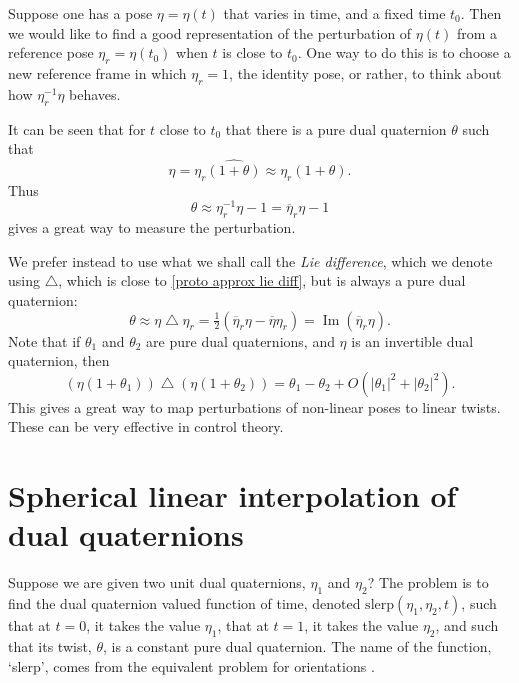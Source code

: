 \documentclass[reqno,12pt]{amsart}
\DeclareMathOperator\imagpart{Im}
\newcommand{\liediff}{\mathbin{\triangle}}
\begin{document}
Suppose one has a pose $\eta = \eta(t)$ that varies in time, and a fixed time $t_0$.  Then we would like to find a good representation of the perturbation of $\eta(t)$ from a reference pose $\eta_r = \eta(t_0)$ when $t$ is close to $t_0$.  One way to do this is to choose a new reference frame in which $\eta_r = 1$, the identity pose, or rather, to think about how $\eta_r ^{-1} \eta$ behaves.

It can be seen that for $t$ close to $t_0$ that there is a pure dual quaternion $\theta$ such that
\begin{equation}
\eta = \eta_r \widehat{(1 + \theta)} \approx \eta_r (1 + \theta) .
\end{equation}
Thus
\begin{equation}
\label{proto approx lie diff}
\theta \approx \eta_r^{-1} \eta - 1 = \overline\eta_r \eta - 1
\end{equation}
gives a great way to measure the perturbation.

We prefer instead to use what we shall call the \emph{Lie difference}, which we denote using $\liediff$, which is close to \eqref{proto approx lie diff}, but is always a pure dual quaternion:
\begin{equation}
\theta \approx \eta\liediff\eta_r = \tfrac12 (\overline\eta_r \eta - \overline\eta \eta_r) = \imagpart(\overline\eta_r \eta).
\end{equation}
Note that if $\theta_1$ and $\theta_2$ are pure dual quaternions, and $\eta$ is an invertible dual quaternion, then
\begin{equation}
\label{approx approx lie diff}
(\eta(1+\theta_1)) \liediff (\eta(1+\theta_2)) = \theta_1 - \theta_2 + O(|\theta_1|^2 + |\theta_2|^2) .
\end{equation}
This gives a great way to map perturbations of non-linear poses to linear twists.  These can be very effective in control theory.

\section{Spherical linear interpolation of dual quaternions}
\label{sec fun dq}

Suppose we are given two unit dual quaternions, $\eta_1$ and $\eta_2$?  The problem is to find the dual quaternion valued function of time, denoted $\text{slerp}(\eta_1, \eta_2, t)$, such that at $t = 0$, it takes the value $\eta_1$, that at $t = 1$, it takes the value $\eta_2$, and such that its twist, $\theta$, is a constant pure dual quaternion.  The name of the function, `slerp', comes from the equivalent problem for orientations \cite{shoemake}.
\end{document}

